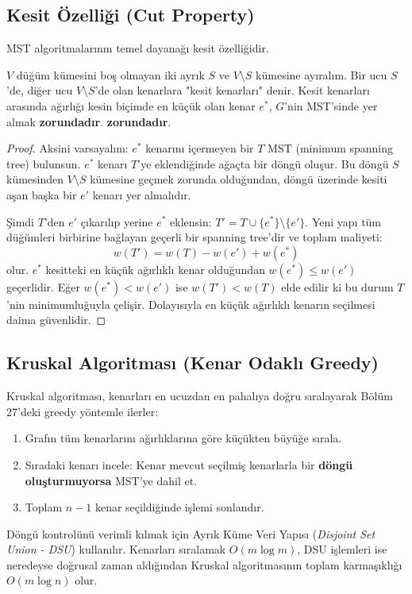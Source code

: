 \subsection{Kesit Özelliği (Cut Property)}
MST algoritmalarının temel dayanağı kesit özelliğidir.

\begin{theorem}
$V$ düğüm kümesini boş olmayan iki ayrık $S$ ve $V \setminus S$ kümesine ayıralım. Bir ucu $S$'de, diğer ucu $V \setminus S$'de olan kenarlara "kesit kenarları" denir. Kesit kenarları arasında ağırlığı kesin biçimde en küçük olan kenar $e^*$, $G$'nin MST'sinde yer almak \textbf{zorundadır}. \textbf{zorundadır}.
\end{theorem}

\begin{proof}
Aksini varsayalım: $e^*$ kenarını içermeyen bir $T$ MST (minimum spanning tree) bulunsun. $e^*$ kenarı $T$'ye eklendiğinde ağaçta bir döngü oluşur. Bu döngü $S$ kümesinden $V \setminus S$ kümesine geçmek zorunda olduğundan, döngü üzerinde kesiti aşan başka bir $e'$ kenarı yer almalıdır.

Şimdi $T$'den $e'$ çıkarılıp yerine $e^*$ eklensin: $T' = T \cup \{e^*\} \setminus \{e'\}$. 
Yeni yapı tüm düğümleri birbirine bağlayan geçerli bir spanning tree'dir ve toplam maliyeti:
\[
w(T') = w(T) - w(e') + w(e^*)
\]
olur. $e^*$ kesitteki en küçük ağırlıklı kenar olduğundan $w(e^*) \le w(e')$ geçerlidir. Eğer $w(e^*) < w(e')$ ise $w(T') < w(T)$ elde edilir ki bu durum $T$'nin minimumluğuyla çelişir. Dolayısıyla en küçük ağırlıklı kenarın seçilmesi daima güvenlidir.
\end{proof}

\subsection{Kruskal Algoritması (Kenar Odaklı Greedy)}
Kruskal algoritması, kenarları en ucuzdan en pahalıya doğru sıralayarak Bölüm 27'deki greedy yöntemle ilerler:
\begin{enumerate}
    \item Grafın tüm kenarlarını ağırlıklarına göre küçükten büyüğe sırala.
    \item Sıradaki kenarı incele: Kenar mevcut seçilmiş kenarlarla bir \textbf{döngü oluşturmuyorsa} MST'ye dahil et.
    \item Toplam $n-1$ kenar seçildiğinde işlemi sonlandır.
\end{enumerate}

Döngü kontrolünü verimli kılmak için Ayrık Küme Veri Yapısı (\emph{Disjoint Set Union - DSU}) kullanılır. Kenarları sıralamak $O(m \log m)$, DSU işlemleri ise neredeyse doğrusal zaman aldığından Kruskal algoritmasının toplam karmaşıklığı $O(m \log n)$ olur.

